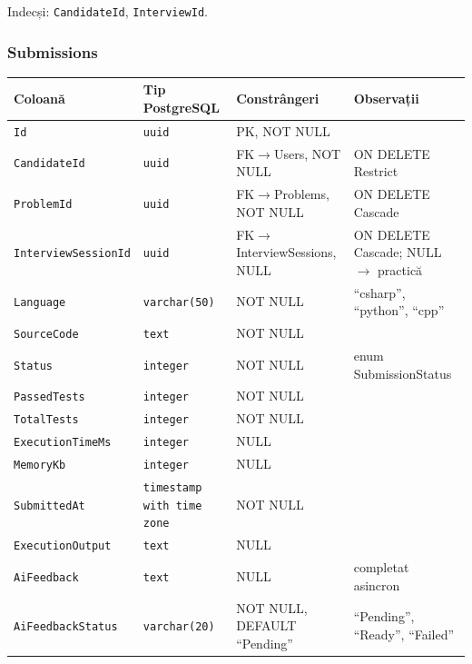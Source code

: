 \medskip
Indecși: \texttt{CandidateId}, \texttt{InterviewId}.

\subsubsection{Submissions}

\begin{tabular}{llll}
\hline
\textbf{Coloană} & \textbf{Tip PostgreSQL} & \textbf{Constrângeri} & \textbf{Observații} \\
\hline
\texttt{Id}                 & \texttt{uuid}        & PK, NOT NULL               & \\
\texttt{CandidateId}        & \texttt{uuid}        & FK$\rightarrow$Users, NOT NULL         & ON DELETE Restrict \\
\texttt{ProblemId}          & \texttt{uuid}        & FK$\rightarrow$Problems, NOT NULL      & ON DELETE Cascade \\
\texttt{InterviewSessionId} & \texttt{uuid}        & FK$\rightarrow$InterviewSessions, NULL & ON DELETE Cascade; NULL $\rightarrow$ practică \\
\texttt{Language}           & \texttt{varchar(50)} & NOT NULL                   & ``csharp'', ``python'', ``cpp'' \\
\texttt{SourceCode}         & \texttt{text}        & NOT NULL                   & \\
\texttt{Status}             & \texttt{integer}     & NOT NULL                   & enum SubmissionStatus \\
\texttt{PassedTests}        & \texttt{integer}     & NOT NULL                   & \\
\texttt{TotalTests}         & \texttt{integer}     & NOT NULL                   & \\
\texttt{ExecutionTimeMs}    & \texttt{integer}     & NULL                       & \\
\texttt{MemoryKb}           & \texttt{integer}     & NULL                       & \\
\texttt{SubmittedAt}        & \texttt{timestamp with time zone} & NOT NULL      & \\
\texttt{ExecutionOutput}    & \texttt{text}        & NULL                       & \\
\texttt{AiFeedback}         & \texttt{text}        & NULL                       & completat asincron \\
\texttt{AiFeedbackStatus}   & \texttt{varchar(20)} & NOT NULL, DEFAULT ``Pending'' & ``Pending'', ``Ready'', ``Failed'' \\
\hline
\end{tabular}

